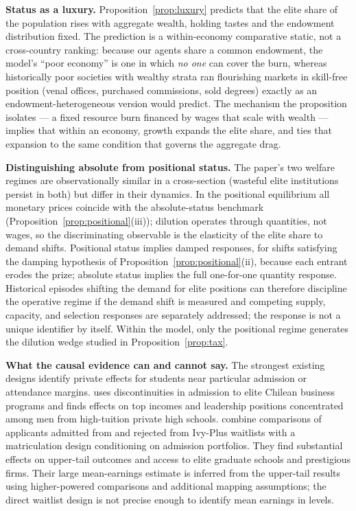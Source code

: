 \documentclass[12pt,letterpaper]{article}
\theoremstyle{definition}
\begin{document}
\textbf{Status as a luxury.}
Proposition~\ref{prop:luxury} predicts that the elite share of the population rises with aggregate wealth, holding tastes and the endowment distribution fixed.
The prediction is a within-economy comparative static, not a cross-country ranking: because our agents share a common endowment, the model's ``poor economy'' is one in which \emph{no one} can cover the burn, whereas historically poor societies with wealthy strata ran flourishing markets in skill-free position (venal offices, purchased commissions, sold degrees) exactly as an endowment-heterogeneous version would predict.
The mechanism the proposition isolates --- a fixed resource burn financed by wages that scale with wealth --- implies that within an economy, growth expands the elite share, and ties that expansion to the same condition that governs the aggregate drag.

\textbf{Distinguishing absolute from positional status.}
The paper's two welfare regimes are observationally similar in a cross-section (wasteful elite institutions persist in both) but differ in their dynamics.
In the positional equilibrium all monetary prices coincide with the absolute-status benchmark (Proposition~\ref{prop:positional}(iii)); dilution operates through quantities, not wages, so the discriminating observable is the elasticity of the elite share to demand shifts.
Positional status implies damped responses, for shifts satisfying the damping hypothesis of Proposition~\ref{prop:positional}(ii), because each entrant erodes the prize; absolute status implies the full one-for-one quantity response.
Historical episodes shifting the demand for elite positions can therefore discipline the operative regime if the demand shift is measured and competing supply, capacity, and selection responses are separately addressed; the response is not a unique identifier by itself.
Within the model, only the positional regime generates the dilution wedge studied in Proposition~\ref{prop:tax}.

\textbf{What the causal evidence can and cannot say.}
The strongest existing designs identify private effects for students near particular admission or attendance margins.
\citet{zimmerman2019elite} uses discontinuities in admission to elite Chilean business programs and finds effects on top incomes and leadership positions concentrated among men from high-tuition private high schools.
\citet{chettydemingfriedman2026} combine comparisons of applicants admitted from and rejected from Ivy-Plus waitlists with a matriculation design conditioning on admission portfolios.
They find substantial effects on upper-tail outcomes and access to elite graduate schools and prestigious firms.
Their large mean-earnings estimate is inferred from the upper-tail results using higher-powered comparisons and additional mapping assumptions; the direct waitlist design is not precise enough to identify mean earnings in levels.
\end{document}
